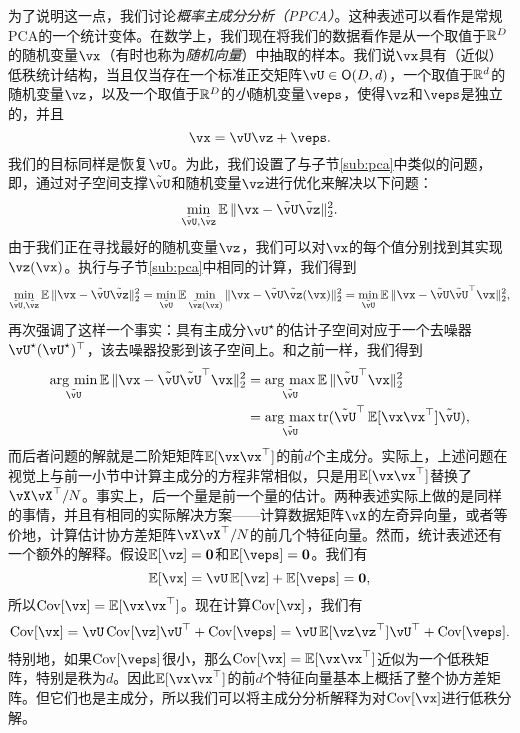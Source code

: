 \documentclass[../../book-main_zh.tex]{subfiles}
\begin{document}
为了说明这一点，我们讨论\textit{概率主成分分析（PPCA）}。这种表述可以看作是常规PCA的一个统计变体。在数学上，我们现在将我们的数据看作是从一个取值于\(\mathbb{R}^{D}\)的随机变量\(\vx\)（有时也称为\textit{随机向量}）中抽取的样本。我们说\(\vx\)具有（近似）低秩统计结构，当且仅当存在一个标准正交矩阵\(\vU \in \O(D, d)\)，一个取值于\(\mathbb{R}^{d}\)的随机变量\(\vz\)，以及一个取值于\(\mathbb{R}^{D}\)的\textit{小}随机变量\(\veps\)，使得\(\vz\)和\(\veps\)是独立的，并且
\begin{equation}
    \vx = \vU\vz + \veps.
\end{equation}
我们的目标同样是恢复\(\vU\)。为此，我们设置了与子节\eqref{sub:pca}中类似的问题，即，通过对子空间支撑\(\tilde{\vU}\)和随机变量\(\vz\)进行优化来解决以下问题：
\begin{equation}
    \min_{\tilde{\vU}, \tilde{\vz}}\Ex\norm{\vx - \tilde{\vU}\tilde{\vz}}_{2}^{2}.
\end{equation}
由于我们正在寻找最好的随机变量\(\vz\)，我们可以对\(\vx\)的每个值分别找到其实现\(\vz(\vx)\)。执行与子节\eqref{sub:pca}中相同的计算，我们得到 %
\begin{equation}\label{eq:ppca_denoising}
    \min_{\tilde{\vU}, \tilde{\vz}}\Ex\norm{\vx - \tilde{\vU}\tilde{\vz}}_{2}^{2} = \min_{\tilde{\vU}}\Ex\min_{\tilde{\vz}(\vx)}\norm{\vx - \tilde{\vU}\tilde{\vz}(\vx)}_{2}^{2} = \min_{\tilde{\vU}}\Ex\norm{\vx - \tilde{\vU}\tilde{\vU}^{\top}\vx}_{2}^{2},
\end{equation}
再次强调了这样一个事实：具有主成分\(\vU^{\star}\)的估计子空间对应于一个去噪器\(\vU^{\star}(\vU^{\star})^{\top}\)，该去噪器投影到该子空间上。和之前一样，我们得到
\begin{align}\label{eq:PPCA}
    \argmin_{\tilde{\vU}}\Ex\norm{\vx - \tilde{\vU}\tilde{\vU}^{\top}\vx}_{2}^{2} 
    &= \argmax_{\tilde{\vU}}\Ex\norm{\tilde{\vU}^{\top}\vx}_{2}^{2} \\
    &= \argmax_{\tilde{\vU}}\tr(\tilde{\vU}^{\top}\Ex[\vx\vx^{\top}]\tilde{\vU}),
\end{align}
而后者问题的解就是二阶矩矩阵\(\Ex[\vx\vx^{\top}]\)的前\(d\)个主成分。实际上，上述问题在视觉上与前一小节中计算主成分的方程非常相似，只是用\(\Ex[\vx\vx^{\top}]\)替换了\(\vX\vX^{\top}/N\)。事实上，后一个量是前一个量的估计。两种表述实际上做的是同样的事情，并且有相同的实际解决方案——计算数据矩阵\(\vX\)的左奇异向量，或者等价地，计算估计协方差矩阵\(\vX\vX^{\top}/N\)的前几个特征向量。然而，统计表述还有一个额外的解释。假设\(\Ex[\vz] = \vzero\)和\(\Ex[\veps] = \vzero\)。我们有
\begin{equation}
    \Ex[\vx] = \vU\Ex[\vz] + \Ex[\veps] = \vzero,
\end{equation}
所以\(\Cov[\vx] = \Ex[\vx\vx^{\top}]\)。现在计算\(\Cov[\vx]\)，我们有
\begin{equation}
    \Cov[\vx] = \vU\Cov[\vz]\vU^{\top} + \Cov[\veps] = \vU\Ex[\vz\vz^{\top}]\vU^{\top} + \Cov[\veps].
\end{equation}
特别地，如果\(\Cov[\veps]\)很小，那么\(\Cov[\vx] = \Ex[\vx\vx^{\top}]\)近似为一个低秩矩阵，特别是秩为\(d\)。因此\(\Ex[\vx\vx^{\top}]\)的前\(d\)个特征向量基本上概括了整个协方差矩阵。但它们也是主成分，所以我们可以将主成分分析解释为对\(\Cov[\vx]\)进行低秩分解。
\end{document}
